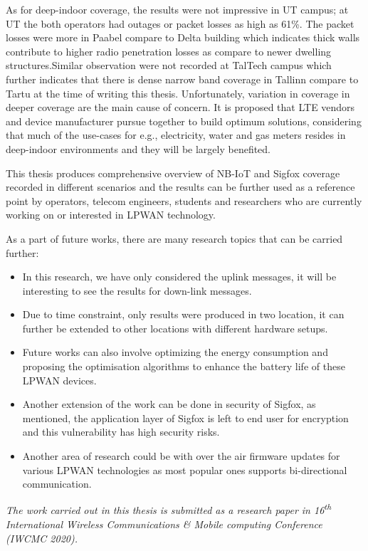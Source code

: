 \documentclass[12pt]{article}
\begin{document}
As for deep-indoor coverage, the results were not impressive in UT campus; at UT the both operators had outages or packet losses as high as 61\%. The packet losses were more in Paabel compare to Delta building which indicates thick walls contribute to higher radio penetration losses as compare to newer dwelling structures.Similar observation were not recorded at TalTech campus which further indicates that there is dense narrow band coverage in Tallinn compare to Tartu at the time of writing this thesis. Unfortunately, variation in coverage in deeper coverage are the main cause of concern. It is proposed that LTE vendors and device manufacturer pursue together to build optimum solutions, considering that much of the use-cases for e.g., electricity, water and gas meters resides in deep-indoor environments and they will be largely benefited. 


This thesis produces comprehensive overview of NB-IoT and Sigfox coverage recorded in different scenarios and the results  can  be  further  used as a reference point by operators, telecom engineers, students and researchers who are currently working on or interested in LPWAN technology.\par 

As a part of future works, there are many research topics that can be carried further:
\begin{itemize}
    \item In this research, we have only considered the uplink messages, it will be interesting to see the results for down-link messages.
    \item Due to time constraint, only results were produced in two location, it can further be extended to other locations with different hardware setups.
    \item Future works can also involve optimizing the energy consumption and proposing the optimisation algorithms to enhance the battery life of these LPWAN devices.
    \item Another extension of the work can be done in security of Sigfox, as mentioned, the application layer of Sigfox is left to end user for encryption and this vulnerability has high security risks. 
    \item Another area of research could be with over the air firmware updates for various LPWAN technologies as most popular ones supports bi-directional communication.

\end{itemize}


\emph{The work carried out in this thesis is submitted as a research paper in 16\textsuperscript{th} International  Wireless Communications \& Mobile computing Conference (IWCMC 2020).}
\end{document}
